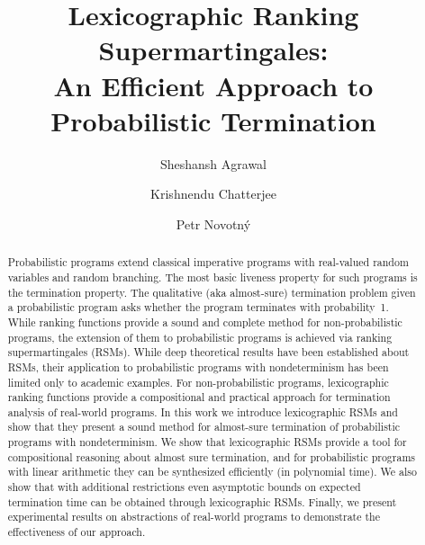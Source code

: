 \documentclass[acmsmall, anonymous]{acmart}
\theoremstyle{example}
\begin{document}

\title{Lexicographic Ranking Supermartingales:\\ An Efficient Approach to 
Probabilistic Termination}

\author{Sheshansh Agrawal}

\author{Krishnendu Chatterjee}

\author{Petr Novotn\'{y}}

\begin{abstract}
Probabilistic programs extend classical imperative programs with 
real-valued random variables and random branching.
The most basic liveness property for such programs is the termination 
property.
The qualitative (aka almost-sure) termination problem given a probabilistic program
asks whether the program terminates with probability~1.
While ranking functions provide a sound and complete method for 
non-probabilistic
programs, the extension of them to probabilistic programs is achieved
via ranking supermartingales (RSMs). 
While deep theoretical results have been established about RSMs, 
their application to probabilistic programs with nondeterminism has been limited
only to academic examples. 
For non-probabilistic programs, lexicographic ranking functions provide a 
compositional
and practical approach for termination analysis of real-world programs. 
In this work we introduce lexicographic RSMs and show that they present a sound
method for almost-sure termination of probabilistic programs with nondeterminism.
We show that lexicographic RSMs provide a tool for compositional reasoning 
about almost sure termination,
and for probabilistic programs with linear arithmetic they can be synthesized 
efficiently (in polynomial time).
We also show that with additional restrictions even asymptotic bounds on expected
termination time can be obtained through lexicographic RSMs.
Finally, we present experimental results on abstractions of real-world programs
to demonstrate the effectiveness of our approach.
\end{abstract}



\maketitle
\end{document}
